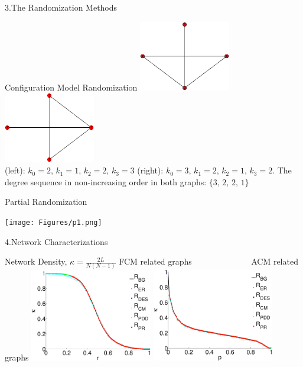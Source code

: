 \documentclass{beamer}
\begin{document}
\begin{frame}{3.The Randomization Methods}

\footnotesize{Configuration Model Randomization} 
	\centering	
	\includegraphics[width=0.3\textwidth]{Figures/G_config_1.eps}  
	\includegraphics[width=0.3\textwidth]{Figures/G_config_2.eps}  \\
\tiny{(left): $k_0 = 2$, $k_1 =1$, $k_2=2$, $k_3=3$  (right): $k_0 = 3$, $k_1 =2$, $k_2=1$, $k_3=2$. The degree sequence in non-increasing order in both graphs: $\{3,\,2,\,2,\,1\}$ } 
\break

\footnotesize{Partial Randomization}

\texttt{[image: Figures/p1.png]}  

\end{frame}



\begin{frame}{4.Network Characterizations}

{Network Density, $\kappa=\frac{2L}{N(N-1)}$} 
\break
\break
\footnotesize{FCM related graphs ~~~~~~~~~~~~~ ACM related graphs}
	\centering	
\includegraphics[width=0.40\textwidth]{Figures/Network_Density_Fnc.eps}
\includegraphics[width=0.40\textwidth]{Figures/Network_Density_Stru.eps} 

\end{frame}
\end{document}
